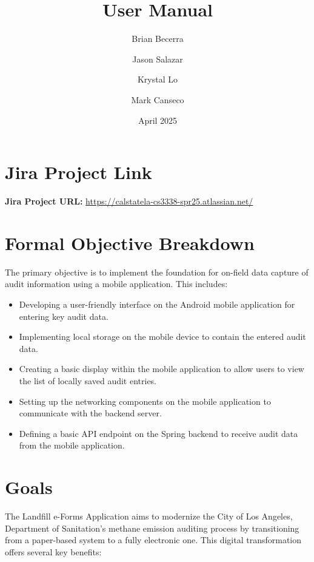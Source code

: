 \documentclass[12pt]{article}
\title{User Manual}
\author{
    Brian Becerra\\
    \and
    Jason Salazar\\
    \and
    Krystal Lo\\
    \and
    Mark Canseco\\
    }
\date{April 2025}
\begin{document}
\begin{titlepage}
\maketitle
\thispagestyle{empty}
\end{titlepage}

\section*{Jira Project Link}

\noindent \textbf{Jira Project URL:} \href{https://calstatela-cs3338-spr25.atlassian.net/}{https://calstatela-cs3338-spr25.atlassian.net/}

\section*{Formal Objective Breakdown}

The primary objective is to implement the foundation for on-field data capture of audit information using a mobile application. This includes:

\begin{itemize}
    \item Developing a user-friendly interface on the Android mobile application for entering key audit data.
    \item Implementing local storage on the mobile device to contain the entered audit data.
    \item Creating a basic display within the mobile application to allow users to view the list of locally saved audit entries.
    \item Setting up the networking components on the mobile application to communicate with the backend server.
    \item Defining a basic API endpoint on the Spring backend to receive audit data from the mobile application.
\end{itemize}

\newpage

\section*{Goals}

The Landfill e-Forms Application aims to modernize the City of Los Angeles, Department of Sanitation's methane emission auditing process by transitioning from a paper-based system to a fully electronic one. This digital transformation offers several key benefits:
\end{document}
